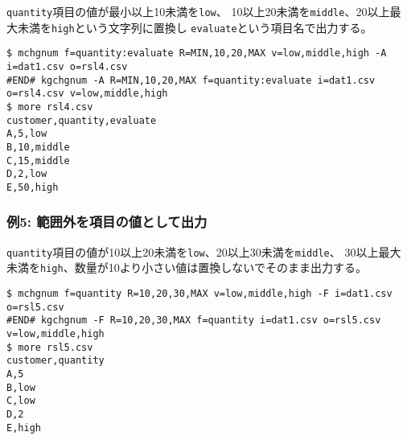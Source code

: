 \verb|quantity|項目の値が最小以上10未満を\verb|low|、
10以上20未満を\verb|middle|、20以上最大未満を\verb|high|という文字列に置換し
\verb|evaluate|という項目名で出力する。


\begin{Verbatim}[baselinestretch=0.7,frame=single]
$ mchgnum f=quantity:evaluate R=MIN,10,20,MAX v=low,middle,high -A i=dat1.csv o=rsl4.csv
#END# kgchgnum -A R=MIN,10,20,MAX f=quantity:evaluate i=dat1.csv o=rsl4.csv v=low,middle,high
$ more rsl4.csv
customer,quantity,evaluate
A,5,low
B,10,middle
C,15,middle
D,2,low
E,50,high
\end{Verbatim}
\subsubsection*{例5: 範囲外を項目の値として出力}

\verb|quantity|項目の値が10以上20未満を\verb|low|、20以上30未満を\verb|middle|、
30以上最大未満を\verb|high|、数量が10より小さい値は置換しないでそのまま出力する。


\begin{Verbatim}[baselinestretch=0.7,frame=single]
$ mchgnum f=quantity R=10,20,30,MAX v=low,middle,high -F i=dat1.csv o=rsl5.csv
#END# kgchgnum -F R=10,20,30,MAX f=quantity i=dat1.csv o=rsl5.csv v=low,middle,high
$ more rsl5.csv
customer,quantity
A,5
B,low
C,low
D,2
E,high
\end{Verbatim}

